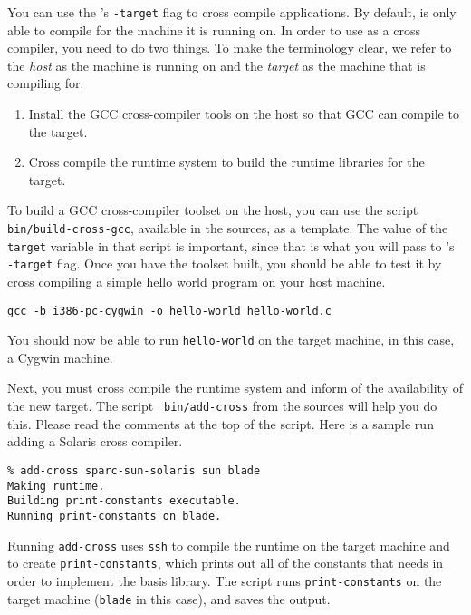 %
You can use the {\mlton}'s {\tt -target} flag to cross compile
applications.  By default, {\mlton} is only able to compile for the
machine it is running on.  In order to use {\mlton} as a cross
compiler, you need to do two things.  To make the terminology clear,
we refer to the {\em host} as the machine {\mlton} is running on and
the {\em target} as the machine that {\mlton} is compiling for.

\begin{enumerate}

\item Install the GCC cross-compiler tools on the host so that GCC can
compile to the target.

\item Cross compile the {\mlton} runtime system to build the runtime
libraries for the target.

\end{enumerate}

To build a GCC cross-compiler toolset on the host, you can use the
script {\tt bin/build-cross-gcc}, available in the {\mlton} sources,
as a template.  The value of the {\tt target} variable in that script
is important, since that is what you will pass to {\mlton}'s {\tt
-target} flag.  Once you have the toolset built, you should be able to
test it by cross compiling a simple hello world program on your host
machine.
\begin{verbatim}
gcc -b i386-pc-cygwin -o hello-world hello-world.c
\end{verbatim}
You should now be able to run {\tt hello-world} on the target machine,
in this case, a Cygwin machine.

Next, you must cross compile the {\mlton} runtime system and inform
{\mlton} of the availability of the new target.  The script {\tt
bin/add-cross} from the {\mlton} sources will help you do this.
Please read the comments at the top of the script.  Here is a sample
run adding a Solaris cross compiler.
\begin{verbatim}
% add-cross sparc-sun-solaris sun blade
Making runtime.
Building print-constants executable.
Running print-constants on blade.
\end{verbatim}
Running {\tt add-cross} uses {\tt ssh} to compile the runtime on the
target machine and to create {\tt print-constants}, which prints out
all of the constants that {\mlton} needs in order to implement the
basis library.  The script runs {\tt print-constants} on the target
machine ({\tt blade} in this case), and saves the output.

